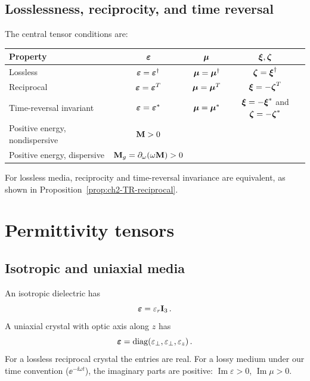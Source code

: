 \subsection{Losslessness, reciprocity, and time reversal}
\label{sec:appD-symmetry-conditions}

The central tensor conditions are:
\begin{center}
\begin{tabular}{lccc}
  \toprule
  \textbf{Property} & $\boldsymbol{\varepsilon}$ & $\boldsymbol{\mu}$ & $\boldsymbol{\xi},\boldsymbol{\zeta}$ \\
  \midrule
  Lossless & $\boldsymbol{\varepsilon}=\boldsymbol{\varepsilon}^\dagger$ & $\boldsymbol{\mu}=\boldsymbol{\mu}^\dagger$ &
    $\boldsymbol{\zeta}=\boldsymbol{\xi}^\dagger$ \\
  Reciprocal & $\boldsymbol{\varepsilon}=\boldsymbol{\varepsilon}^T$ & $\boldsymbol{\mu}=\boldsymbol{\mu}^T$ &
    $\boldsymbol{\xi}=-\boldsymbol{\zeta}^T$ \\
  Time-reversal invariant & $\boldsymbol{\varepsilon}=\boldsymbol{\varepsilon}^*$ & $\boldsymbol{\mu}=\boldsymbol{\mu}^*$ &
    $\boldsymbol{\xi}=-\boldsymbol{\xi}^*$ and $\boldsymbol{\zeta}=-\boldsymbol{\zeta}^*$ \\
  Positive energy, nondispersive & $\mathbf{M}>0$ & & \\
  Positive energy, dispersive & $\mathbf{M}_g=\partial_\omega(\omega\mathbf{M})>0$ & & \\
  \bottomrule
\end{tabular}
\end{center}
For lossless media, reciprocity and time-reversal invariance are
equivalent, as shown in Proposition~\ref{prop:ch2-TR-reciprocal}.

\section{Permittivity tensors}
\label{sec:appD-eps}

\subsection{Isotropic and uniaxial media}
\label{sec:appD-isotropic-uniaxial}

An isotropic dielectric has
\begin{equation}\label{eq:appD-isotropic-eps}
  \boldsymbol{\varepsilon}=\varepsilon_r\mathbf{I}_3\,.
\end{equation}
A uniaxial crystal with optic axis along $z$ has
\begin{equation}\label{eq:appD-uniaxial-eps}
  \boldsymbol{\varepsilon}=\operatorname{diag}(\varepsilon_\perp,\varepsilon_\perp,\varepsilon_z)\,.
\end{equation}
For a lossless reciprocal crystal the entries are real.  For a lossy
medium under our time convention ($\ee^{-\ii\omega t}$), the imaginary
parts are positive: $\operatorname{Im}\varepsilon>0$,
$\operatorname{Im}\mu>0$.


